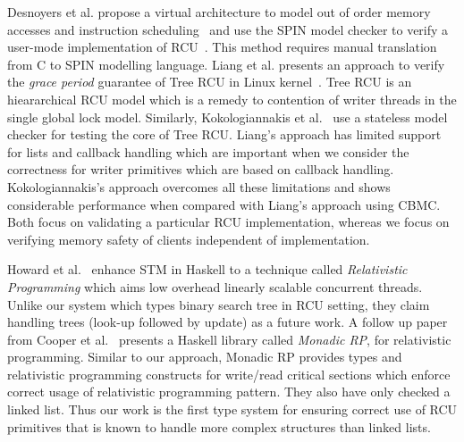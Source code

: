 Desnoyers et al. propose a virtual architecture to model out of order memory accesses and instruction scheduling~\cite{Desnoyers:2013:MSM:2506164.2506174} and use the \textsf{SPIN} model checker to verify a user-mode implementation of RCU~\cite{urcu_ieee}. This method requires manual translation from C to SPIN modelling language.
Liang et al. presents an approach to verify the \emph{grace period} guarantee of \textsf{Tree RCU} in Linux kernel~\cite{LiangMKM16}. \textsf{Tree RCU} is an hieararchical \textsf{RCU} model which is a remedy to contention of writer threads in the single global lock model. 
Similarly, Kokologiannakis et al.~\cite{Kokologiannakis:2017:SMC:3092282.3092287} use a stateless model checker for testing the core of \textsf{Tree RCU}.
Liang's approach has limited support for lists and callback handling which are important when we consider the correctness for writer primitives which are based on callback handling. Kokologiannakis's approach overcomes all these limitations and shows considerable performance when compared with Liang's approach using \textsf{CBMC}. 
Both focus on validating a particular RCU implementation, whereas we focus on verifying memory safety of clients independent of implementation.
 
Howard et al.~\cite{Howard:2011:RES:2001252.2001267} enhance \textsf{STM} in Haskell to a technique called \textit{Relativistic Programming} which aims low overhead linearly scalable concurrent threads. Unlike our system which types binary search tree in \textsf{RCU} setting, they claim  handling trees (look-up followed by update) as a future work.
A follow up paper from Cooper et al.~\cite{Cooper2015RelativisticPI} presents a \textsf{Haskell} library called \emph{Monadic RP}, for relativistic programming. Similar to our approach, Monadic RP provides types and relativistic programming constructs for write/read critical sections which enforce correct usage of relativistic programming pattern. 
They also have only checked a linked list.
Thus our work is the first type system for ensuring correct use of RCU primitives that is known to handle more complex structures than linked lists.

